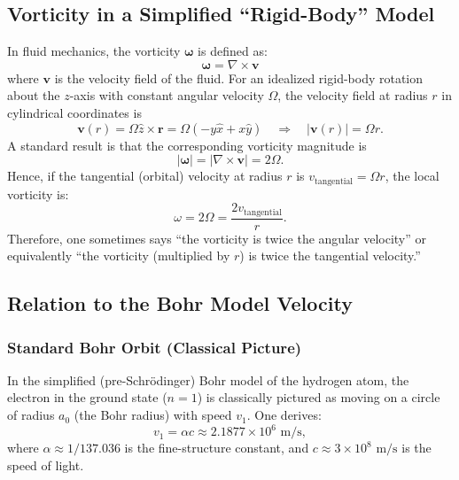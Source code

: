 \documentclass[a4paper,10pt]{article}
\begin{document}
    \subsection{Vorticity in a Simplified ``Rigid-Body'' Model}
    In fluid mechanics, the vorticity $\boldsymbol{\omega}$ is defined as:
    \begin{equation}
        \boldsymbol{\omega} = \nabla \times \mathbf{v}
    \end{equation}
    where $\mathbf{v}$ is the velocity field of the fluid. For an idealized rigid-body rotation about the $z$-axis with constant angular velocity $\Omega$, the velocity field at radius $r$ in cylindrical coordinates is
    \begin{equation}
        \mathbf{v}(r) = \Omega \hat{z} \times \mathbf{r} = \Omega(-y\hat{x} + x\hat{y}) \quad \Rightarrow \quad |
        \mathbf{v}(r)| = \Omega r.
    \end{equation}
    A standard result is that the corresponding vorticity magnitude is
    \begin{equation}
        |\boldsymbol{\omega}| = \left| \nabla \times \mathbf{v} \right| = 2\Omega.
    \end{equation}
    Hence, if the tangential (orbital) velocity at radius $r$ is $v_\text{tangential} = \Omega r$, the local vorticity is:
    \begin{equation}
        \omega = 2\Omega = \frac{2v_\text{tangential}}{r}.
    \end{equation}
    Therefore, one sometimes says ``the vorticity is twice the angular velocity'' or equivalently ``the vorticity (multiplied by $r$) is twice the tangential velocity.''

    \subsection{Relation to the Bohr Model Velocity}
    \subsubsection{Standard Bohr Orbit (Classical Picture)}
    In the simplified (pre-Schr\"odinger) Bohr model of the hydrogen atom, the electron in the ground state ($n=1$) is classically pictured as moving on a circle of radius $a_0$ (the Bohr radius) with speed $v_1$. One derives:
    \begin{equation}
        v_1 = \alpha c \approx 2.1877 \times 10^6 \text{ m/s},
    \end{equation}
    where $\alpha \approx 1/137.036$ is the fine-structure constant, and $c \approx 3 \times 10^8 \text{ m/s}$ is the speed of light.
\end{document}
